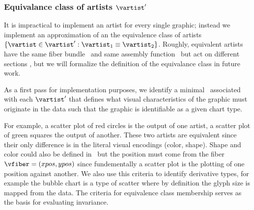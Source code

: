 \documentclass[../main.tex]{subfiles}
\begin{document}
\subsubsection{Equivalance class of artists $\vartist^{\prime}$}
\label{sec:artist_equivalance}
It is impractical to implement an artist for every single graphic; instead we implement an approximation of an the equivalence class of artists $\{\vartist \in \vartist^{\prime}: \vartist_{1} \equiv \vartist_{2}\}$. Roughly, equivalent artists have the same fiber bundle \vtotal\ and same assembly function \vmark\ but act on different sections \vsection, but we will formalize the definition of the equivalance class in future work. 

As a first pass for implementation purposes, we identify a minimal \vfiber\ associated with each $\vartist^{\prime}$ that defines what visual characteristics of the graphic must originate in the data such that the graphic is identifiable as a given chart type.

For example, a scatter plot of red circles is the output of one artist, a scatter plot of green squares the output of another. These two artists are equivalent since their only difference is in the literal visual encodings (color, shape). Shape and color could also be defined in \vmark\, but the position must come from the fiber $\vfiber=(xpos,ypos)$ since fundementally a scatter plot is the plotting of one position against another\cite{friendlyBriefHistoryData2008}. We also use this criteria to identify derivative types, for example the bubble chart\cite{tufteVisualDisplayQuantitative2001} is a type of scatter where by definition the glyph size is mapped from the data. The criteria for equivalence class membership serves as the basis for evaluating invariance\cite{kindlmann2014algebraic}. 
\end{document}
